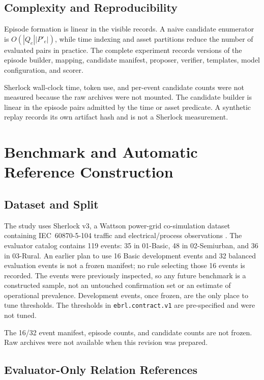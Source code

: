 \documentclass[conference]{IEEEtran}
\begin{document}
\subsection{Complexity and Reproducibility}

Episode formation is linear in the visible records. A naive candidate enumerator is $O(|Q_e||P'_e|)$, while time indexing and asset partitions reduce the number of evaluated pairs in practice. The complete experiment records versions of the episode builder, mapping, candidate manifest, proposer, verifier, templates, model configuration, and scorer.

Sherlock wall-clock time, token use, and per-event candidate counts were not measured because the raw archives were not mounted. The candidate builder is linear in the episode pairs admitted by the time or asset predicate. A synthetic replay records its own artifact hash and is not a Sherlock measurement.

\FloatBarrier
\section{Benchmark and Automatic Reference Construction}

\subsection{Dataset and Split}

The study uses Sherlock v3, a Wattson power-grid co-simulation dataset containing IEC~60870-5-104 traffic and electrical/process observations \cite{wagner2025sherlock,sherlockv3}. The evaluator catalog contains 119 events: 35 in 01-Basic, 48 in 02-Semiurban, and 36 in 03-Rural. An earlier plan to use 16 Basic development events and 32 balanced evaluation events is not a frozen manifest; no rule selecting those 16 events is recorded. The events were previously inspected, so any future benchmark is a constructed sample, not an untouched confirmation set or an estimate of operational prevalence. Development events, once frozen, are the only place to tune thresholds. The thresholds in \texttt{ebrl.contract.v1} are pre-specified and were not tuned.

The 16/32 event manifest, episode counts, and candidate counts are not frozen. Raw archives were not available when this revision was prepared.

\subsection{Evaluator-Only Relation References}
\end{document}
